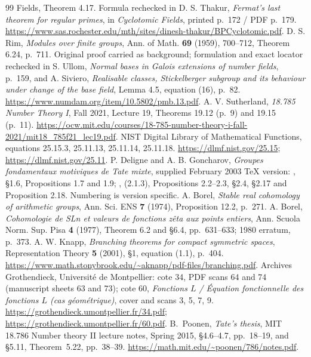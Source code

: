 \documentclass[11pt,a4paper]{article}
\theoremstyle{definition}
\begin{document}
\begin{thebibliography}{99}
{Fields}, Theorem 4.17. Formula rechecked in D. S. Thakur,
\emph{Fermat's last theorem for regular primes}, in \emph{Cyclotomic
Fields}, printed p.~172 / PDF p.~179.
\url{https://www.sas.rochester.edu/mth/sites/dinesh-thakur/BPCyclotomic.pdf}.
 D. S. Rim, \emph{Modules over finite groups}, Ann. of Math.
\textbf{69} (1959), 700--712, Theorem 6.24, p.~711. Original proof carried
as background; formulation and exact locator rechecked in S. Ullom,
\emph{Normal bases in Galois extensions of number fields}, p.~159,
and A. Siviero, \emph{Realisable classes, Stickelberger subgroup and its
behaviour under change of the base field}, Lemma 4.5, equation (16), p.~82.
\url{https://www.numdam.org/item/10.5802/pmb.13.pdf}.
 A. V. Sutherland, \emph{18.785 Number Theory I},
Fall 2021, Lecture 19, Theorems 19.12 (p.~9) and 19.15 (p.~11).
\url{https://ocw.mit.edu/courses/18-785-number-theory-i-fall-2021/mit18_785f21_lec19.pdf}.
 NIST Digital Library of Mathematical Functions,
equations 25.15.3, 25.11.13, 25.11.14, 25.11.18.
\url{https://dlmf.nist.gov/25.15}; \url{https://dlmf.nist.gov/25.11}.
 P. Deligne and A. B. Goncharov,
\emph{Groupes fondamentaux motiviques de Tate mixte}, supplied February
2003 TeX version: , \S1.6, Propositions 1.7 and 1.9;
, (2.1.3), Propositions 2.2--2.3, \S2.4,
\S2.17 and Proposition 2.18. Numbering is version specific.
 A. Borel, \emph{Stable real cohomology of arithmetic
groups}, Ann. Sci. ENS \textbf{7} (1974), Proposition 12.2, p.~271.
 A. Borel, \emph{Cohomologie de SLn et valeurs de
fonctions z\^eta aux points entiers}, Ann. Scuola Norm. Sup. Pisa
\textbf{4} (1977), Theorem 6.2 and \S6.4, pp.~631--633; 1980 erratum,
p.~373.
 A. W. Knapp, \emph{Branching theorems for compact
symmetric spaces}, Representation Theory \textbf{5} (2001), \S1,
equation (1.1), p.~404.
\url{https://www.math.stonybrook.edu/~aknapp/pdf-files/branching.pdf}.
 Archives Grothendieck, Universit\'e de Montpellier:
cote 34, PDF scans 64 and 74 (manuscript sheets 63 and 73);
cote 60, \emph{Fonctions $L$ / \'Equation fonctionnelle des fonctions $L$
(cas g\'eom\'etrique)}, cover and scans 3, 5, 7, 9.
\url{https://grothendieck.umontpellier.fr/34.pdf};
\url{https://grothendieck.umontpellier.fr/60.pdf}.
B.~Poonen, \emph{Tate's thesis}, MIT 18.786 Number theory II lecture notes,
Spring 2015, \S4.6--4.7, pp.~18--19, and \S5.11,
Theorem~5.22, pp.~38--39.
\url{https://math.mit.edu/~poonen/786/notes.pdf}.


\end{thebibliography}
\end{document}
